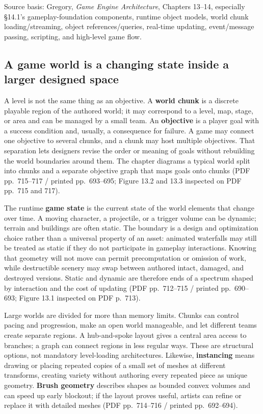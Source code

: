 Source basis: Gregory, \emph{Game Engine Architecture}, Chapters 13--14, especially §14.1's gameplay-foundation components, runtime object models, world chunk loading/streaming, object references/queries, real-time updating, event/message passing, scripting, and high-level game flow.

\subsection{A game world is a changing state inside a larger designed space}\label{06-engine-ii-ch031-a-game-world-is-a-changing-state-inside-a-larger-designed-space}

\hypertarget{06-engine-ii-ch031-a-game-world-is-a-changing-state-inside-a-larger-designed-space}{}

A level is not the same thing as an objective. A \textbf{world chunk} is a discrete playable region of the authored world; it may correspond to a level, map, stage, or area and can be managed by a small team. An \textbf{objective} is a player goal with a success condition and, usually, a consequence for failure. A game may connect one objective to several chunks, and a chunk may host multiple objectives. That separation lets designers revise the order or meaning of goals without rebuilding the world boundaries around them. The chapter diagrams a typical world split into chunks and a separate objective graph that maps goals onto chunks (PDF pp.~715--717 / printed pp.~693--695; Figure 13.2 and 13.3 inspected on PDF pp.~715 and 717).

The runtime \textbf{game state} is the current state of the world elements that change over time. A moving character, a projectile, or a trigger volume can be dynamic; terrain and buildings are often static. The boundary is a design and optimization choice rather than a universal property of an asset: animated waterfalls may still be treated as static if they do not participate in gameplay interactions. Knowing that geometry will not move can permit precomputation or omission of work, while destructible scenery may swap between authored intact, damaged, and destroyed versions. Static and dynamic are therefore ends of a spectrum shaped by interaction and the cost of updating (PDF pp.~712--715 / printed pp.~690--693; Figure 13.1 inspected on PDF p.~713).

Large worlds are divided for more than memory limits. Chunks can control pacing and progression, make an open world manageable, and let different teams create separate regions. A hub-and-spoke layout gives a central area access to branches; a graph can connect regions in less regular ways. These are structural options, not mandatory level-loading architectures. Likewise, \textbf{instancing} means drawing or placing repeated copies of a small set of meshes at different transforms, creating variety without authoring every repeated piece as unique geometry. \textbf{Brush geometry} describes shapes as bounded convex volumes and can speed up early blockout; if the layout proves useful, artists can refine or replace it with detailed meshes (PDF pp.~714--716 / printed pp.~692--694).

